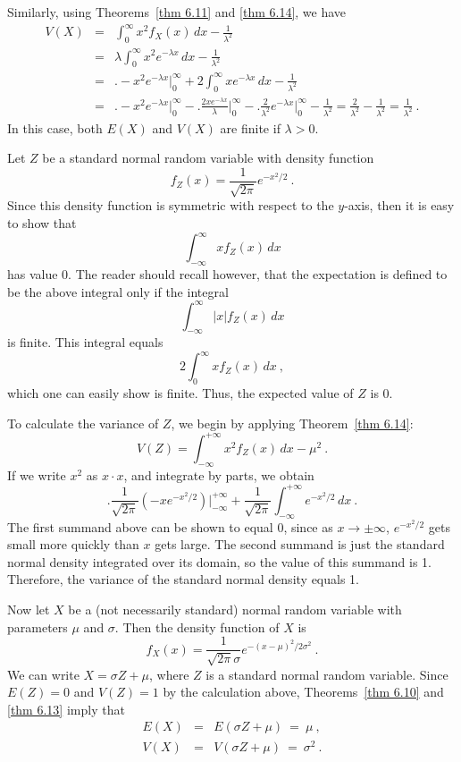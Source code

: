 {\begin{example}
Similarly, using Theorems~\ref{thm 6.11} and \ref{thm 6.14}, we have
\begin{eqnarray*} V(X) & = & \int_0^\infty x^2 f_X(x)\, dx - \frac 1{\lambda^2} \\
     & = & \lambda \int_0^\infty x^2 e^{-\lambda x}\, dx - \frac 1{\lambda^2} \\
     & = & \biggl.-x^2 e^{-\lambda x}\biggr|_0^\infty + 2\int_0^\infty x e^{-\lambda
x}\, dx - \frac 1{\lambda^2} \\
     & = & \biggl.-x^2 e^{-\lambda x}\biggr|_0^\infty - \biggl.\frac {2xe^{-\lambda
x}}\lambda\biggr|_0^\infty - \biggl.\frac 2{\lambda^2} e^{-\lambda x}\biggr|_0^\infty
-
\frac 1{\lambda^2} =
\frac 2{\lambda^2} - \frac 1{\lambda^2} = \frac 1{\lambda^2}\ .
\end{eqnarray*} In this case, both $E(X)$ and $V(X)$ are finite if $\lambda > 0$.
\end{example}

\begin{example}\label{exam 6.22} Let $Z$ be a standard normal random variable with
density function
$$ f_Z(x) = \frac 1{\sqrt{2\pi}} e^{-x^2/2}\ .
$$  Since this density function is symmetric with respect to the $y$-axis, then it is
easy to show that
$$\int_{-\infty}^\infty x f_Z(x)\, dx$$ has value 0.  The reader should recall
however, that the expectation is defined to be the above integral only if the integral
$$\int_{-\infty}^\infty |x| f_Z(x)\, dx$$ is finite.  This integral equals
$$2\int_0^\infty x f_Z(x)\, dx\ ,$$ which one can easily show is finite.  Thus, the
expected value of $Z$ is 0.
\par To calculate the variance of $Z$, we begin by applying Theorem~\ref{thm 6.14}:
$$V(Z) =  \int_{-\infty}^{+\infty} x^2 f_Z(x)\, dx - \mu^2\ .$$ If we write $x^2$ as
$x\cdot x$, and integrate by parts, we obtain
$$\biggl.\frac 1{\sqrt{2\pi}} (-x e^{-x^2/2})\biggr|_{-\infty}^{+\infty} + \frac
1{\sqrt{2\pi}} \int_{-\infty}^{+\infty} e^{-x^2/2}\, dx\ .
$$ The first summand above can be shown to equal 0, since as $x \rightarrow \pm
\infty$, $e^{-x^2/2}$ gets small more quickly than $x$ gets large.  The second
summand is just the standard normal density integrated over its domain, so the value
of this summand is 1.  Therefore, the variance of the standard normal density equals
1.
\par Now let $X$ be a (not necessarily standard) normal random variable with
parameters
$\mu$ and $\sigma$.  Then the density function of $X$ is
$$ f_X(x) = \frac 1{\sqrt{2\pi}\sigma} e^{-(x - \mu)^2/2\sigma^2}\ .
$$  We can write $X = \sigma Z + \mu$, where $Z$ is a standard normal random
variable.  Since
$E(Z) = 0$ and $V(Z) = 1$ by the calculation above, Theorems~\ref{thm 6.10} and
\ref{thm 6.13} imply that
\begin{eqnarray*} 
E(X)  &=& E(\sigma Z + \mu)\ =\ \mu\ , \\ 
V(X)  &=& V(\sigma Z + \mu)\ =\ \sigma^2\ .
\end{eqnarray*}
\end{example}

}
